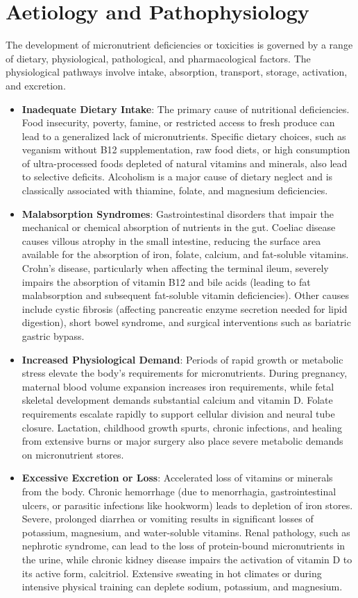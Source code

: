 \section*{Aetiology and Pathophysiology}
The development of micronutrient deficiencies or toxicities is governed by a range of dietary, physiological, pathological, and pharmacological factors. The physiological pathways involve intake, absorption, transport, storage, activation, and excretion.
\begin{itemize}
\item \textbf{Inadequate Dietary Intake}: The primary cause of nutritional deficiencies. Food insecurity, poverty, famine, or restricted access to fresh produce can lead to a generalized lack of micronutrients. Specific dietary choices, such as veganism without B12 supplementation, raw food diets, or high consumption of ultra-processed foods depleted of natural vitamins and minerals, also lead to selective deficits. Alcoholism is a major cause of dietary neglect and is classically associated with thiamine, folate, and magnesium deficiencies.
\item \textbf{Malabsorption Syndromes}: Gastrointestinal disorders that impair the mechanical or chemical absorption of nutrients in the gut. Coeliac disease causes villous atrophy in the small intestine, reducing the surface area available for the absorption of iron, folate, calcium, and fat-soluble vitamins. Crohn's disease, particularly when affecting the terminal ileum, severely impairs the absorption of vitamin B12 and bile acids (leading to fat malabsorption and subsequent fat-soluble vitamin deficiencies). Other causes include cystic fibrosis (affecting pancreatic enzyme secretion needed for lipid digestion), short bowel syndrome, and surgical interventions such as bariatric gastric bypass.
\item \textbf{Increased Physiological Demand}: Periods of rapid growth or metabolic stress elevate the body's requirements for micronutrients. During pregnancy, maternal blood volume expansion increases iron requirements, while fetal skeletal development demands substantial calcium and vitamin D. Folate requirements escalate rapidly to support cellular division and neural tube closure. Lactation, childhood growth spurts, chronic infections, and healing from extensive burns or major surgery also place severe metabolic demands on micronutrient stores.
\item \textbf{Excessive Excretion or Loss}: Accelerated loss of vitamins or minerals from the body. Chronic hemorrhage (due to menorrhagia, gastrointestinal ulcers, or parasitic infections like hookworm) leads to depletion of iron stores. Severe, prolonged diarrhea or vomiting results in significant losses of potassium, magnesium, and water-soluble vitamins. Renal pathology, such as nephrotic syndrome, can lead to the loss of protein-bound micronutrients in the urine, while chronic kidney disease impairs the activation of vitamin D to its active form, calcitriol. Extensive sweating in hot climates or during intensive physical training can deplete sodium, potassium, and magnesium.

\end{itemize}
